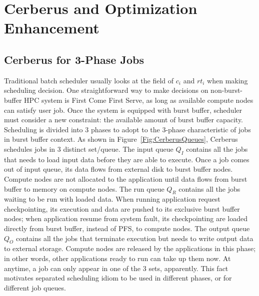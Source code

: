 \section{Cerberus and Optimization Enhancement}
\label{Sec:Scheduler}

\subsection{Cerberus for 3-Phase Jobs}
Traditional batch scheduler usually looks at the field of $c_i$ and $rt_i$
when making scheduling decision.
One straightforward way to make decisions on non-burst-buffer HPC system is
First Come First Serve, as long as available compute nodes can satisfy user job.
Once the system is equipped with burst buffer, scheduler must consider a new constraint:
the available amount of burst buffer capacity.
Scheduling is divided into 3 phases to
adopt to the 3-phase characteristic of jobs in burst buffer context.
As shown in Figure~\ref{Fig:CerberusQueues},
Cerberus schedules jobs in 3 distinct set/queue.
The input queue $Q_I$ contains all the jobs that
needs to load input data before they are able to execute.
Once a job comes out of input queue, its data flows from external disk
to burst buffer nodes.
Compute nodes are not allocated to the application until
data flows from burst buffer to memory on compute nodes.
The run queue $Q_R$ contains all the jobs waiting to be run with loaded data.
When running application request checkpointing, its execution and data are
pushed to its exclusive burst buffer nodes;
when application resume from system fault, its checkpointing are
loaded directly from burst buffer, instead of PFS, to compute nodes.
The output queue $Q_O$ contains all the jobs that
terminate execution but needs to write output data to external storage.
Compute nodes are released by the applications in this phase;
in other words, other applications ready to run can take up them now.
At anytime, a job can only appear in one of the 3 sets, apparently.
This fact motivates separated scheduling idiom to be used in different phases,
or for different job queues.


